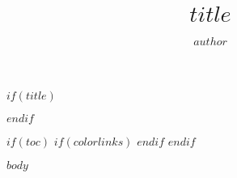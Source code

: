 \documentclass[a4paper,11pt,hidelinks]{article}
\author{$author$}
\date{}
\title{$title$}
\begin{document}
$if(title)$
\maketitle
$endif$

$if(toc)$
$if(colorlinks)$
\hypersetup{linkcolor=$if(toccolor)$$toccolor$$else$$endif$}
$endif$
\setcounter{tocdepth}{$toc-depth$}
\tableofcontents
$endif$

$body$
\end{document}
